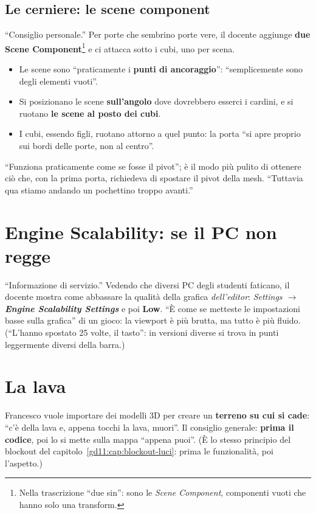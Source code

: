 \subsection{Le cerniere: le scene component}

``Consiglio personale.'' Per porte che sembrino porte vere, il docente aggiunge
\textbf{due Scene Component}\footnote{Nella trascrizione ``due sin'': sono le
\emph{Scene Component}, componenti vuoti che hanno solo una transform.} e ci
attacca sotto i cubi, uno per scena.
\begin{itemize}
  \item Le scene sono ``praticamente i \textbf{punti di ancoraggio}'':
        ``semplicemente sono degli elementi vuoti''.
  \item Si posizionano le scene \textbf{sull'angolo} dove dovrebbero esserci i
        cardini, e si ruotano \textbf{le scene al posto dei cubi}.
  \item I cubi, essendo figli, ruotano attorno a quel punto: la porta ``si apre
        proprio sui bordi delle porte, non al centro''.
\end{itemize}
``Funziona praticamente come se fosse il pivot''; è il modo più pulito di
ottenere ciò che, con la prima porta, richiedeva di spostare il pivot della mesh.
``Tuttavia qua stiamo andando un pochettino troppo avanti.''

\section{Engine Scalability: se il PC non regge}
\label{gd12:sec:scalability}

``Informazione di servizio.'' Vedendo che diversi PC degli studenti faticano, il
docente mostra come abbassare la qualità della grafica \emph{dell'editor}:
\emph{Settings $\rightarrow$ \textbf{Engine Scalability Settings}} e poi
\textbf{Low}. ``È come se metteste le impostazioni basse sulla grafica'' di un
gioco: la viewport è più brutta, ma tutto è più fluido. (``L'hanno spostato 25
volte, il tasto'': in versioni diverse si trova in punti leggermente diversi
della barra.)

\section{La lava}
\label{gd12:sec:lava}

Francesco vuole importare dei modelli 3D per creare un \textbf{terreno su cui
si cade}: ``c'è della lava e, appena tocchi la lava, muori''. Il consiglio
generale: \textbf{prima il codice}, poi lo si mette sulla mappa ``appena puoi''.
(È lo stesso principio del blockout del capitolo~\ref{gd11:cap:blockout-luci}:
prima le funzionalità, poi l'aspetto.)

